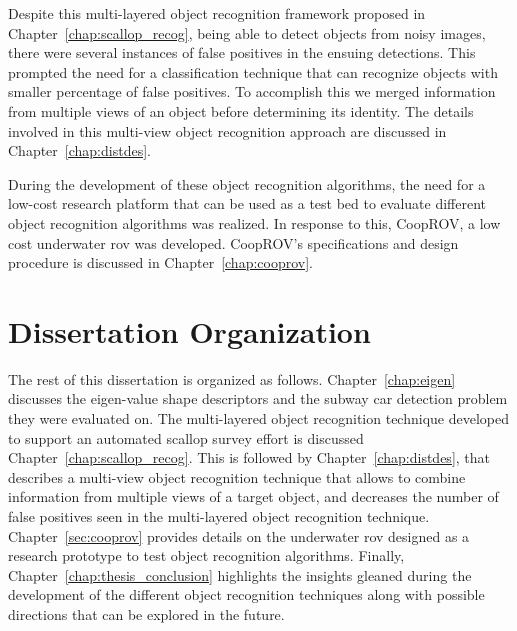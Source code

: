 Despite this multi-layered object recognition framework proposed in Chapter~\ref{chap:scallop_recog}, being able to detect objects from noisy images, there were 
several instances of false positives in the ensuing detections. This prompted the need for a classification technique that can recognize objects with smaller percentage of
false positives. To accomplish this we merged information from multiple views of an object before determining its identity. The details involved in this
multi-view object recognition approach are discussed in Chapter~\ref{chap:distdes}.

During the development of these object recognition algorithms, the need for a low-cost research platform 
that can be used as a test bed to evaluate different object recognition algorithms was realized.
In response to this, CoopROV, a low cost underwater \gls{rov} was developed. CoopROV's specifications and 
design procedure is discussed in Chapter~\ref{chap:cooprov}.

\section{Dissertation Organization}

The rest of this dissertation is organized as follows. 
Chapter~\ref{chap:eigen} discusses the eigen-value shape descriptors and the subway car detection problem they were evaluated on.
The multi-layered object recognition technique developed to support an automated scallop survey effort 
is discussed Chapter~\ref{chap:scallop_recog}.
This is followed by Chapter~\ref{chap:distdes}, that describes a multi-view object recognition technique that allows to combine information from multiple views of a target object, and decreases the number of false positives seen in the multi-layered object recognition technique.
Chapter~\ref{sec:cooprov} provides details on the underwater \gls{rov} designed as a research prototype to test object recognition algorithms.
Finally, Chapter~\ref{chap:thesis_conclusion} highlights the insights gleaned during the development of the different object recognition techniques along with possible directions that can be explored in the future.

